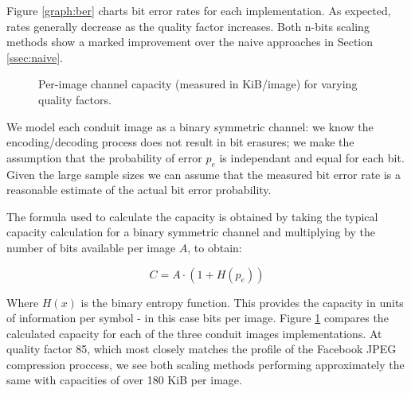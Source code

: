 Figure \ref{graph:ber} charts bit error rates for each implementation. As expected, rates generally decrease as the quality factor increases. Both n-bits scaling methods show a marked improvement over the naive approaches in Section \ref{ssec:naive}.


\begin{figure}[tbph]
  \begin{center}
    \caption{Per-image channel capacity (measured in KiB/image) for varying quality factors.}
    \label{graph:capacity}
  \end{center}
\end{figure}

We model each conduit image as a binary symmetric channel: we know the encoding/decoding process does not result in bit erasures; we make the assumption that the probability of error $p_e$ is independant and equal for each bit. Given the large sample sizes we can assume that the measured bit error rate is a reasonable estimate of the actual bit error probability.

The formula used to calculate the capacity is obtained by taking the typical capacity calculation for a binary symmetric channel and multiplying by the number of bits available per image $A$, to obtain:

\begin{equation}
    C = A \cdot (1 + H(p_e))
\end{equation}

Where $H(x)$ is the binary entropy function. This provides the capacity in units of information per symbol - in this case bits per image. Figure \ref{graph:capacity} compares the calculated capacity for each of the three conduit images implementations. At quality factor 85, which most closely matches the profile of the Facebook JPEG compression proccess, we see both scaling methods performing approximately the same with capacities of over 180 KiB per image.


